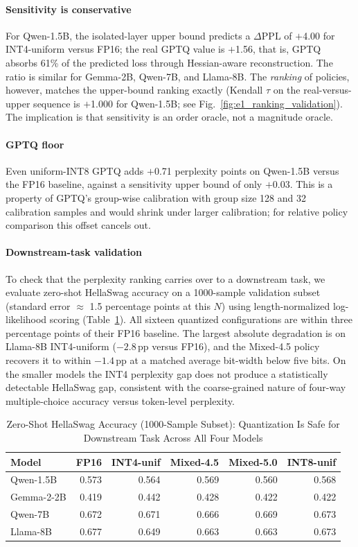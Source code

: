 \documentclass{ieeeaccess}
\begin{document}
\paragraph{Sensitivity is conservative}
For Qwen-1.5B, the isolated-layer upper bound predicts a
$\Delta \mathrm{PPL}$ of $+$4.00 for INT4-uniform versus FP16; the real
GPTQ value is $+$1.56, that is, GPTQ absorbs 61\% of the predicted loss
through Hessian-aware reconstruction. The ratio is similar for Gemma-2B,
Qwen-7B, and Llama-8B. The \emph{ranking} of policies, however, matches the
upper-bound ranking exactly (Kendall $\tau$ on the real-versus-upper
sequence is $+$1.000 for Qwen-1.5B; see
Fig.~\ref{fig:e1_ranking_validation}). The implication is that
sensitivity is an order oracle, not a magnitude oracle.

\paragraph{GPTQ floor}
Even uniform-INT8 GPTQ adds $+$0.71 perplexity points on Qwen-1.5B
versus the FP16 baseline, against a sensitivity upper bound of only
$+$0.03. This is a property of GPTQ's group-wise calibration with
group size 128 and 32 calibration samples and would shrink under larger
calibration; for relative policy comparison this offset cancels out.

\paragraph{Downstream-task validation}
To check that the perplexity ranking carries over to a downstream task,
we evaluate zero-shot HellaSwag accuracy on a 1000-sample validation
subset (standard error $\approx$ 1.5 percentage points at this $N$)
using length-normalized log-likelihood scoring
(Table~\ref{tab:hellaswag}). All sixteen quantized configurations are
within three percentage points of their FP16 baseline. The largest
absolute degradation is on Llama-8B INT4-uniform ($-2.8$\,pp versus
FP16), and the Mixed-4.5 policy recovers it to within $-1.4$\,pp at a
matched average bit-width below five bits. On the smaller models the
INT4 perplexity gap does not produce a statistically detectable
HellaSwag gap, consistent with the coarse-grained nature of four-way
multiple-choice accuracy versus token-level perplexity.

\begin{table}[t]
\caption{Zero-Shot HellaSwag Accuracy (1000-Sample Subset): Quantization Is Safe for Downstream Task Across All Four Models}
\label{tab:hellaswag}
\centering
\small
\begin{tabular}{lrrrrr}
\toprule
Model      & FP16  & INT4-unif & Mixed-4.5 & Mixed-5.0 & INT8-unif \\
\midrule
Qwen-1.5B  & 0.573 & 0.564 & 0.569 & 0.560 & 0.568 \\
Gemma-2-2B & 0.419 & 0.442 & 0.428 & 0.422 & 0.422 \\
Qwen-7B    & 0.672 & 0.671 & 0.666 & 0.669 & 0.673 \\
Llama-8B   & 0.677 & 0.649 & 0.663 & 0.663 & 0.673 \\
\bottomrule
\end{tabular}
\end{table}
\end{document}
